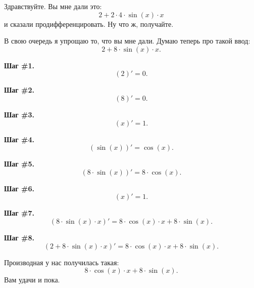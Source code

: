 \documentclass{article}
\begin{document}
Здравствуйте. Вы мне дали это: $$2 + 2 \cdot 4 \cdot \sin\left(x\right) \cdot x$$ и сказали продифференцировать. Ну что ж, получайте.

В свою очередь я упрощаю то, что вы мне дали. Думаю теперь про такой ввод: $$2 + 8 \cdot \sin\left(x\right) \cdot x.$$

\textbf{Шаг \#1.} $${\left( 2 \right) }' = 0.$$

\textbf{Шаг \#2.} $${\left( 8 \right) }' = 0.$$

\textbf{Шаг \#3.} $${\left( x \right) }' = 1.$$

\textbf{Шаг \#4.} $${\left( \sin\left(x\right) \right) }' = \cos\left(x\right).$$

\textbf{Шаг \#5.} $${\left( 8 \cdot \sin\left(x\right) \right) }' = 8 \cdot \cos\left(x\right).$$

\textbf{Шаг \#6.} $${\left( x \right) }' = 1.$$

\textbf{Шаг \#7.} $${\left( 8 \cdot \sin\left(x\right) \cdot x \right) }' = 8 \cdot \cos\left(x\right) \cdot x + 8 \cdot \sin\left(x\right).$$

\textbf{Шаг \#8.} $${\left( 2 + 8 \cdot \sin\left(x\right) \cdot x \right) }' = 8 \cdot \cos\left(x\right) \cdot x + 8 \cdot \sin\left(x\right).$$

Производная у нас получилась такая: $$
8 \cdot \cos\left(x\right) \cdot x + 8 \cdot \sin\left(x\right).$$ Вам удачи и пока.
\end{document}
